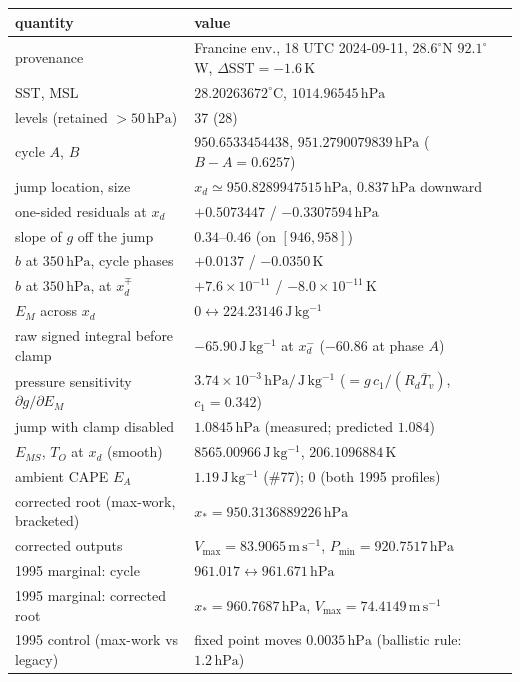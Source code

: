 \documentclass[11pt,a4paper]{article}
\theoremstyle{definition}
\newcommand{\hPa}{\,\mathrm{hPa}}
\newcommand{\Jkg}{\,\mathrm{J\,kg^{-1}}}
\newcommand{\K}{\,\mathrm{K}}
\newcommand{\ms}{\,\mathrm{m\,s^{-1}}}
\begin{document}
\begin{center}
\footnotesize
\begin{tabular}{@{}ll@{}}
\toprule
quantity & value\\
\midrule
provenance & Francine env., 18 UTC 2024-09-11, $28.6^{\circ}$N
$92.1^{\circ}$W, $\Delta\mathrm{SST}=-1.6\K$\\
SST, MSL & $28.20263672^{\circ}$C, $1014.96545\hPa$\\
levels (retained $>50\hPa$) & 37 (28)\\
cycle $A$, $B$ & $950.6533454438$, $951.2790079839\hPa$
($B{-}A=0.6257$)\\
jump location, size & $x_d\simeq950.8289947515\hPa$, $0.837\hPa$ downward\\
one-sided residuals at $x_d$ & $+0.5073447$ / $-0.3307594\hPa$\\
slope of $g$ off the jump & $0.34$--$0.46$ (on $[946,958]$)\\
$b$ at $350\hPa$, cycle phases & $+0.0137$ / $-0.0350\K$\\
$b$ at $350\hPa$, at $x_d^{\mp}$ & $+7.6\times10^{-11}$ /
$-8.0\times10^{-11}\K$\\
$E_M$ across $x_d$ & $0 \leftrightarrow 224.23146\Jkg$\\
raw signed integral before clamp & $-65.90\Jkg$ at $x_d^-$
($-60.86$ at phase $A$)\\
pressure sensitivity $\partial g/\partial E_M$ &
$3.74\times10^{-3}\hPa/\Jkg$ ($=g\,c_1/(R_d\overline T_v)$, $c_1=0.342$)\\
jump with clamp disabled & $1.0845\hPa$ (measured; predicted $1.084$)\\
$E_{MS}$, $T_O$ at $x_d$ (smooth) & $8565.00966\Jkg$, $206.1096884\K$\\
ambient CAPE $E_A$ & $1.19\Jkg$ (\#77); $0$ (both 1995 profiles)\\
corrected root (max-work, bracketed) & $x_*=950.3136889226\hPa$\\
corrected outputs & $V_{\max}=83.9065\ms$, $P_{\min}=920.7517\hPa$\\
1995 marginal: cycle & $961.017\leftrightarrow961.671\hPa$\\
1995 marginal: corrected root & $x_*=960.7687\hPa$, $V_{\max}=74.4149\ms$\\
1995 control (max-work vs legacy) & fixed point moves $0.0035\hPa$
(ballistic rule: $1.2\hPa$)\\
\bottomrule
\end{tabular}
\end{center}
\end{document}

